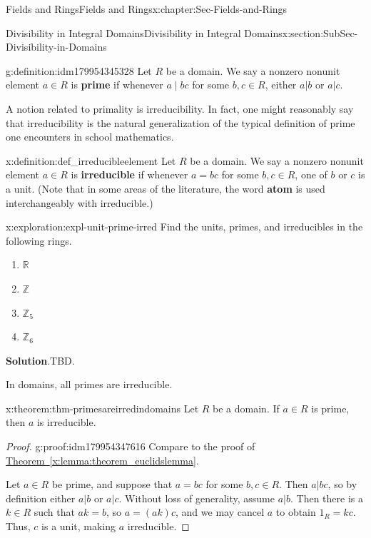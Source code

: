 \documentclass[oneside,10pt,]{book}
\newcommand{\blocktitlefont}{\relax}
\newcommand{\xreffont}{\relax}
\newcommand{\terminology}[1]{\textbf{#1}}
\numberwithin{equation}{section}
\def\Z{{\mathbb Z}}
\def\R{{\mathbb R}}
\begin{document}
\begin{chapterptx}{Fields and Rings}{}{Fields and Rings}{}{}{x:chapter:Sec-Fields-and-Rings}
\begin{sectionptx}{Divisibility in Integral Domains}{}{Divisibility in Integral Domains}{}{}{x:section:SubSec-Divisibility-in-Domains}
\begin{definition}{}{g:definition:idm179954345328}
Let \(R\) be a domain. We say a nonzero nonunit element \(a\in R\) is \terminology{prime} if whenever \(a\mid bc\) for some \(b,c\in R\), either \(a|b\) or \(a|c\).%
\end{definition}
A notion related to primality is irreducibility. In fact, one might reasonably say that irreducibility is the natural generalization of the typical definition of prime one encounters in school mathematics.%
\begin{definition}{}{x:definition:def_irreducibleelement}%
%
%
Let \(R\) be a domain. We say a nonzero nonunit element \(a\in R\) is \terminology{irreducible} if whenever \(a = bc\) for some \(b,c\in R\), one of \(b\) or \(c\) is a unit. (Note that in some areas of the literature, the word \terminology{atom} is used interchangeably with irreducible.)%
\end{definition}
\begin{exploration}{}{x:exploration:expl-unit-prime-irred}%
Find the units, primes, and irreducibles in the following rings.%
%
\begin{enumerate}
\item{}\(\displaystyle \R\)%
\item{}\(\displaystyle \Z\)%
\item{}\(\displaystyle \Z_{5}\)%
\item{}\(\displaystyle \Z_6\)%
\end{enumerate}
\par\smallskip%
\noindent\textbf{\blocktitlefont Solution}.\hypertarget{g:solution:idm179954418320}{}\quad{}TBD.%
\end{exploration}
In domains, all primes are irreducible.%
\begin{theorem}{}{}{x:theorem:thm-primesareirredindomains}%
Let \(R\) be a domain. If \(a\in R\) is prime, then \(a\) is irreducible.%
\end{theorem}
\begin{proof}{}{g:proof:idm179954347616}
Compare to the proof of \hyperref[x:lemma:theorem_euclidslemma]{Theorem~{\xreffont\ref{x:lemma:theorem_euclidslemma}}}.%
\par
Let \(a\in R\) be prime, and suppose that \(a = bc\) for some \(b,c\in R\). Then \(a|bc\), so by definition either \(a|b\) or \(a|c\). Without loss of generality, assume \(a|b\). Then there is a \(k\in R\) such that \(ak=b\), so \(a = (ak)c\), and we may cancel \(a\) to obtain \(1_R = kc\). Thus, \(c\) is a unit, making \(a\) irreducible.%
\end{proof}

\end{sectionptx}
\end{chapterptx}
\end{document}
